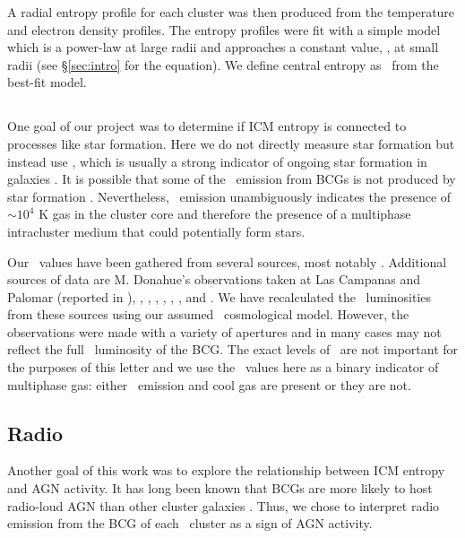 \documentclass{emulateapj}
\begin{document}
A radial entropy profile for each cluster was then produced from the
temperature and electron density profiles. The entropy profiles were
fit with a simple model which is a power-law at large radii and
approaches a constant value, \kna, at small radii (see
\S\ref{sec:intro} for the equation). We define central entropy as
\kna\ from the best-fit model.

\subsection{\halpha}
\label{sec:ha}

One goal of our project was to determine if ICM entropy is connected
to processes like star formation. Here we do not directly measure star
formation but instead use \halpha, which is usually a strong indicator
of ongoing star formation in galaxies \citep{kennicuttrelation}. It is
possible that some of the \halpha\ emission from BCGs is not produced
by star formation \citep{begelman90, sparks04, rusz08,
 ferland08}. Nevertheless, \halpha\ emission unambiguously indicates
the presence of $\sim 10^4$ K gas in the cluster core and therefore
the presence of a multiphase intracluster medium that could
potentially form stars.

Our \halpha\ values have been gathered from several sources, most
notably \cite{crawford99}. Additional sources of data are M. Donahue's
observations taken at Las Campanas and Palomar (reported in
\citealt{accept}), \cite{heckman89}, \cite{dsg92}, \cite{lawrence96},
\cite{1996AJ....112.1390V}, \cite{white97},
\cite{2005MNRAS.363..216C}, and \cite{quillen08}. We have recalculated
the \halpha\ luminosities from these sources using our assumed
\LCDM\ cosmological model.  However, the observations were made with a
variety of apertures and in many cases may not reflect the full
\halpha\ luminosity of the BCG. The exact levels of \lha\ are not
important for the purposes of this letter and we use the \lha\ values
here as a binary indicator of multiphase gas: either \halpha\ emission
and cool gas are present or they are not.

\subsection{Radio}
\label{sec:radio}

Another goal of this work was to explore the relationship between ICM
entropy and AGN activity. It has long been known that BCGs are more
likely to host radio-loud AGN than other cluster galaxies
\citep{burns81, valentijn83, burns90}. Thus, we chose to interpret
radio emission from the BCG of each \accept\ cluster as a sign of AGN
activity.
\end{document}
